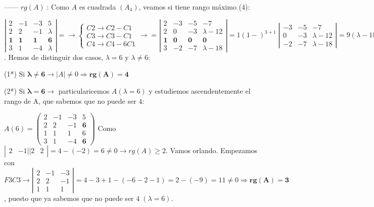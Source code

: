 \begin{proofw}\renewcommand{\qedsymbol}{$\diamond$}


------ $rg(A)\; $: Como $A$ es cuadrada $(A_4)$, veamos si tiene rango máximo ($4$):

$\left| \begin{matrix} 2&-1&-3&5\\2&2&-1&\lambda\\ \boldsymbol{1}&\boldsymbol{1}&\boldsymbol{1}&\boldsymbol{6}\\3&1&-4&\lambda \end{matrix} \right|= \to \begin{cases} C2\to C2-C1 \\ C3\to C3-C1 \\ C4\to C4-6C1   \end{cases} \to = \left| \begin{matrix} 2&-3&-5&-7\\2&0&-3&\lambda-12\\ \boldsymbol{1}&\boldsymbol{0}&\boldsymbol{0}&\boldsymbol{0}\\3&-2&-7&\lambda-18 \end{matrix} \right|= 1 (1-)^{3+1}\; \left| \begin{matrix} -3&-5&-7\\0&-3&\lambda-12\\-2&-7&\lambda-18 \end{matrix} \right| = 9(\lambda-18)+10(\lambda-12)-(-42+21(\lambda-12))=9(\lambda-18)-11(\lambda-12)+42=-2\lambda+12=0 \leftrightarrow \lambda=6$. Hemos de distinguir dos casos, $\lambda=6$ y $\lambda\neq 6$:

(1*) Si $\boldsymbol{ \lambda\neq 6} \to |A|\neq 0 \Rightarrow \boldsymbol{rg(A)=4}$

(2*)  Si $\boldsymbol{ \lambda = 6} \to $ particularicemos $A(\lambda=6)$ y estudiemos ascendentemente el rango de A, que sabemos que no puede ser $4$:

$A(6)=\left( \begin{matrix} \boxed{2}&\boxed{-1}&-3&5\\\boxed{2}&\boxed{2}&-1&\boldsymbol{6}\\1&1&1&6\\3&1&-4&\boldsymbol{6} \end{matrix} \right) $ Como $\left| \begin{matrix} 2&-1||2&2 \end{matrix} \right|=4-(-2)=6\neq 0 \to rg(A)\ge 2$. Vamos orlando. Empezamos con $F3C3\to \left| \begin{matrix} 2&-1&-3\\2&2&-1\\1&1&1 \end{matrix} \right|= 4-3+1-(-6-2-1)=2-(-9)=11\neq 0 \Rightarrow \boldsymbol{rg(A)=3}$, puesto que ya sabemos que no puede ser $4 \; (\lambda=6)$.


\end{proofw}
